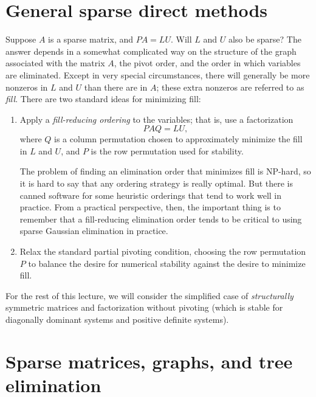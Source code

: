 \documentclass[12pt, leqno]{article}
\begin{document}
\section{General sparse direct methods}

Suppose $A$ is a sparse matrix, and $PA = LU$.  Will $L$ and $U$ also
be sparse?  The answer depends in a somewhat complicated way on the
structure of the graph associated with the matrix $A$, the pivot
order, and the order in which variables are eliminated.  Except in
very special circumstances, there will generally be more nonzeros in
$L$ and $U$ than there are in $A$; these extra nonzeros are referred
to as {\em fill}.  There are two standard ideas for minimizing fill:
\begin{enumerate}
\item
  Apply a {\em fill-reducing ordering} to the variables; that is,
  use a factorization
  \[
    PAQ = LU,
  \]
  where $Q$ is a column permutation chosen to approximately minimize
  the fill in $L$ and $U$, and $P$ is the row permutation used for
  stability.

  The problem of finding an elimination order that minimizes fill is
  NP-hard, so it is hard to say that any ordering strategy is really
  optimal.  But there is canned software for some heuristic orderings
  that tend to work well in practice.  From a practical perspective,
  then, the important thing is to remember that a fill-reducing
  elimination order tends to be critical to using sparse Gaussian
  elimination in practice.
\item
  Relax the standard partial pivoting condition, choosing the row
  permutation $P$ to balance the desire for numerical stability
  against the desire to minimize fill.
\end{enumerate}

For the rest of this lecture, we will consider the simplified case of
{\em structurally} symmetric matrices and factorization without
pivoting (which is stable for diagonally dominant systems and positive
definite systems).

\section{Sparse matrices, graphs, and tree elimination}
\end{document}
